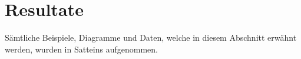 \section{Resultate}
Sämtliche Beispiele, Diagramme und Daten, welche in diesem Abschnitt erwähnt werden, wurden in Satteins aufgenommen.

\newpage

\newpage


\newpage